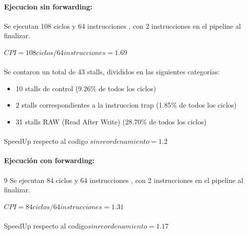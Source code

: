 \documentclass[a4paper,11pt]{article}
\begin{document}
\begin{enumerate}
\paragraph{Ejecucion sin forwarding:}

\paragraph{}
Se ejecutan 108 ciclos y 64 instrucciones , con 2 instrucciones en el  pipeline al finalizar.

\begin{center}
$CPI = 108 ciclos / 64 instrucciones = 1.69 $
\end{center}

\paragraph{}

Se contaron un total de 43 stalls, divididos en las siguientes categor\'ias:

\begin{itemize}
 \item 10 stalls de control (9.26\% de todos los ciclos)
 \item  2  stalls correspondientes a la instruccion trap (1.85\% de todos los ciclos)
 \item  31 stalls RAW (Read After Write) (28.70\% de todos los ciclos)
\end{itemize}

\paragraph{}
SpeedUp respecto al codigo $sin reordenamiento = 1.2$

\paragraph{Ejecuci\'on con forwarding:}

\paragraph{}9
Se ejecutan 84 ciclos y 64 instrucciones , con 2 instrucciones en el  pipeline al finalizar.

\begin{center}
$CPI = 84 ciclos / 64 instrucciones = 1.31$
\end{center}

\paragraph{}
SpeedUp respecto al codigo$ sin reordenamiento = 1.17$


\end{enumerate}
\end{document}
